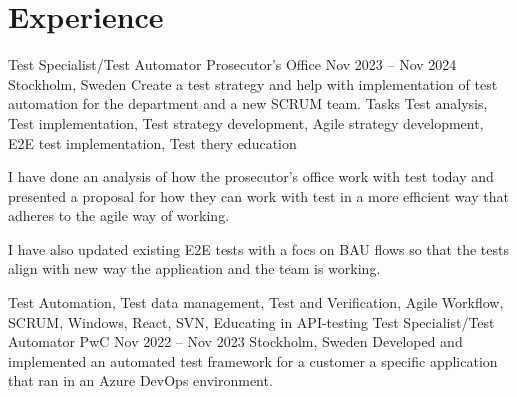 \documentclass{sobCV}[2015/09/08]
\begin{document}
\section{Experience}
   \experiencenode
   {Test Specialist/Test Automator}
   {Prosecutor's Office}
   {Nov 2023 -- Nov 2024}
   {Stockholm, Sweden}{
       Create a test strategy and help with implementation of test automation
       for the department and a new SCRUM team.
   }
   {Tasks}{
       Test analysis,
       Test implementation,
       Test strategy development,
       Agile strategy development,
       E2E test implementation,
       Test thery education
 }{  %
      {
       I have done an analysis of how the prosecutor's office work with test
       today and presented a proposal for how they can work with test in a more
       efficient way that adheres to the agile way of working.

       I have also updated existing E2E tests with a focs on BAU flows so that
       the tests align with new way the application and the team is working.  

     }
 }{
     Test Automation,
     Test data management,
     Test and Verification,
     Agile Workflow,
     SCRUM,
     Windows,
     React,
     SVN,
     Educating in API-testing
}
\experiencenode
   {Test Specialist/Test Automator}
   {PwC}
   {Nov 2022 -- Nov 2023}
   {Stockholm, Sweden}{
       Developed and implemented an automated test framework for a customer
       a specific application that ran in an Azure DevOps environment.
   }
\end{document}
